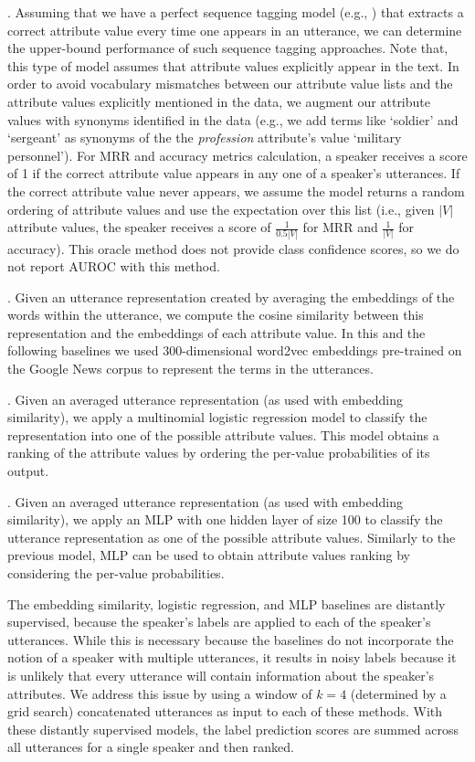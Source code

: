 .
Assuming that we have a perfect sequence tagging model (e.g., \cite{dial7}) that extracts a correct attribute value every time one appears in an utterance, we can determine the upper-bound performance of such sequence tagging approaches. Note that, this type of model assumes that attribute values explicitly appear in the text.
In order to avoid vocabulary mismatches between our attribute value lists and the attribute values explicitly mentioned in the data, we augment our attribute values with synonyms identified in the data
(e.g., we add terms like `soldier' and `sergeant' as synonyms of the 
the \textit{profession} attribute's value `military personnel').
For MRR and accuracy metrics calculation, a speaker receives a score of 1 if the correct attribute value appears in any one of a speaker's utterances. If the correct attribute value never appears, we assume the model returns a random ordering of attribute values and use the expectation over this list (i.e., given $|V|$ attribute values, the speaker receives a score of $\frac{1}{0.5|V|}$ for MRR and $\frac{1}{|V|}$ for accuracy). This oracle method does not provide class confidence scores, so we do not report AUROC with this method.

.
Given an utterance representation created by averaging the embeddings of the words within the utterance,
we compute the cosine similarity between this representation and the embeddings of each attribute value. In this and the following baselines we used 300-dimensional word2vec embeddings pre-trained on the Google News corpus \cite{embed1} to represent the terms in the utterances. 

. 
Given an averaged utterance representation (as used with embedding similarity),
we apply a multinomial logistic regression model \cite{mccullagh2019generalized} to classify the representation into one of the possible attribute values. This model obtains a ranking of the attribute values by ordering the per-value probabilities of its output.

. Given an averaged utterance representation (as used with embedding similarity), we apply an MLP with one hidden layer of size 100 to classify the utterance representation as one of the possible attribute values. Similarly to the previous model, MLP can be used to obtain attribute values ranking by considering the per-value probabilities.

\vspace{5pt}The embedding similarity, logistic regression, and MLP baselines are distantly supervised, because the speaker's labels are applied to each of the speaker's utterances. While this is necessary because the baselines do not incorporate the notion of a speaker with multiple utterances, it results in noisy labels because it is unlikely that every utterance will contain information about the speaker's attributes.
We address this issue by using a window of $k = 4$ (determined by a grid search) concatenated utterances as input to each of these methods. With these distantly supervised models, the label prediction scores are summed across all utterances for a single speaker and then ranked.

